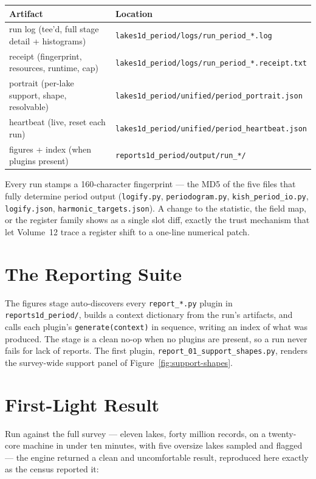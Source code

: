 \documentclass[11pt, letterpaper, openany]{book}
\begin{document}
\begin{table}[H]
\centering
\small
\begin{tabular}{@{}ll@{}}
\toprule
\textbf{Artifact} & \textbf{Location} \\
\midrule
run log (tee'd, full stage detail + histograms) & \texttt{lakes1d\_period/logs/run\_period\_*.log} \\
receipt (fingerprint, resources, runtime, cap) & \texttt{lakes1d\_period/logs/run\_period\_*.receipt.txt} \\
portrait (per-lake support, shape, resolvable) & \texttt{lakes1d\_period/unified/period\_portrait.json} \\
heartbeat (live, reset each run) & \texttt{lakes1d\_period/unified/period\_heartbeat.json} \\
figures + index (when plugins present) & \texttt{reports1d\_period/output/run\_*/} \\
\bottomrule
\end{tabular}
\end{table}

Every run stamps a 160-character fingerprint --- the MD5 of the five files that fully determine
period output (\texttt{logify.py}, \texttt{periodogram.py}, \texttt{kish\_period\_io.py},
\texttt{logify.json}, \texttt{harmonic\_targets.json}). A change to the statistic, the field map, or
the register family shows as a single slot diff, exactly the trust mechanism that let Volume~12
trace a register shift to a one-line numerical patch.

\section{The Reporting Suite}

The figures stage auto-discovers every \texttt{report\_*.py} plugin in \texttt{reports1d\_period/},
builds a context dictionary from the run's artifacts, and calls each plugin's
\texttt{generate(context)} in sequence, writing an index of what was produced. The stage is a clean
no-op when no plugins are present, so a run never fails for lack of reports. The first plugin,
\texttt{report\_01\_support\_shapes.py}, renders the survey-wide support panel of
Figure~\ref{fig:support-shapes}.

\section{First-Light Result}

Run against the full survey --- eleven lakes, forty million records, on a twenty-core machine in
under ten minutes, with five oversize lakes sampled and flagged --- the engine returned a clean and
uncomfortable result, reproduced here exactly as the census reported it:
\end{document}
